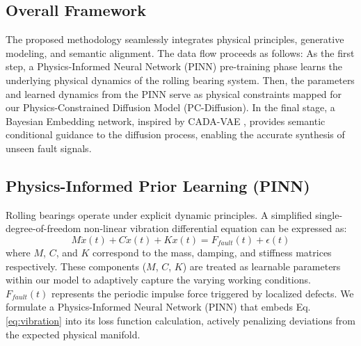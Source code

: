 \documentclass[journal]{IEEEtran}
\begin{document}
\subsection{Overall Framework}
The proposed methodology seamlessly integrates physical principles, generative modeling, and semantic alignment. The data flow proceeds as follows: As the first step, a Physics-Informed Neural Network (PINN) pre-training phase learns the underlying physical dynamics of the rolling bearing system. Then, the parameters and learned dynamics from the PINN serve as physical constraints mapped for our Physics-Constrained Diffusion Model (PC-Diffusion). In the final stage, a Bayesian Embedding network, inspired by CADA-VAE \cite{schonfeld2019cada}, provides semantic conditional guidance to the diffusion process, enabling the accurate synthesis of unseen fault signals.

\subsection{Physics-Informed Prior Learning (PINN)}
Rolling bearings operate under explicit dynamic principles. A simplified single-degree-of-freedom non-linear vibration differential equation can be expressed as:
\begin{equation}
    M \ddot{x}(t) + C \dot{x}(t) + K x(t) = F_{fault}(t) + \epsilon(t)
    \label{eq:vibration}
\end{equation}
where $M$, $C$, and $K$ correspond to the mass, damping, and stiffness matrices respectively. These components ($M$, $C$, $K$) are treated as learnable parameters within our model to adaptively capture the varying working conditions. $F_{fault}(t)$ represents the periodic impulse force triggered by localized defects. We formulate a Physics-Informed Neural Network (PINN) \cite{raissi2019physics} that embeds Eq. \ref{eq:vibration} into its loss function calculation, actively penalizing deviations from the expected physical manifold.
\end{document}
